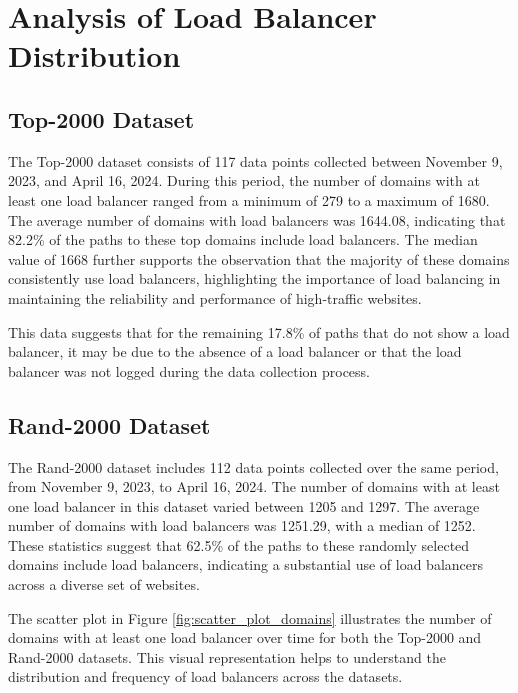 \documentclass[12pt]{cwru_thesis}
\begin{document}
\section{Analysis of Load Balancer Distribution}

\subsection{Top-2000 Dataset}

The Top-2000 dataset consists of 117 data points collected between November 9, 2023, and April 16, 2024. During this period, the number of domains with at least one load balancer ranged from a minimum of 279 to a maximum of 1680. The average number of domains with load balancers was 1644.08, indicating that 82.2\% of the paths to these top domains include load balancers. The median value of 1668 further supports the observation that the majority of these domains consistently use load balancers, highlighting the importance of load balancing in maintaining the reliability and performance of high-traffic websites.

This data suggests that for the remaining 17.8\% of paths that do not show a load balancer, it may be due to the absence of a load balancer or that the load balancer was not logged during the data collection process.



\subsection{Rand-2000 Dataset}

The Rand-2000 dataset includes 112 data points collected over the same period, from November 9, 2023, to April 16, 2024. The number of domains with at least one load balancer in this dataset varied between 1205 and 1297. The average number of domains with load balancers was 1251.29, with a median of 1252. These statistics suggest that 62.5\% of the paths to these randomly selected domains include load balancers, indicating a substantial use of load balancers across a diverse set of websites.


The scatter plot in Figure \ref{fig:scatter_plot_domains} illustrates the number of domains with at least one load balancer over time for both the Top-2000 and Rand-2000 datasets. 
This visual representation helps to understand the distribution and frequency of load balancers across the datasets.
\end{document}
